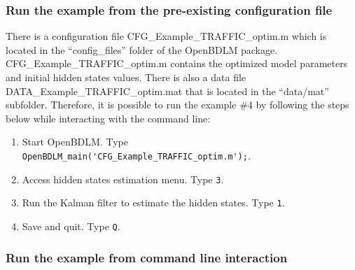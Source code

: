 \subsubsection{Run the example from the pre-existing configuration file}
\label{SS:LoadConfigFileTraffic}


There is a configuration file CFG\_Example\_TRAFFIC\_optim.m which is located in the ``config\_files'' folder of the OpenBDLM package.
CFG\_Example\_TRAFFIC\_optim.m contains the optimized model parameters and initial hidden states values.
There is also a data file DATA\_Example\_TRAFFIC\_optim.mat that is located in the ``data/mat'' subfolder.
Therefore, it is possible to run the example \#4 by following the steps below while interacting with the \MATLAB{} command line:
\begin{enumerate}
\item Start OpenBDLM. Type \colorbox{light-gray}{\lstinline[basicstyle = \mlttfamily \small, backgroundcolor = \color{light-gray}]!OpenBDLM_main('CFG_Example_TRAFFIC_optim.m');!}.
\item Access hidden states estimation menu. Type \colorbox{light-gray}{\lstinline[basicstyle = \mlttfamily \small, backgroundcolor = \color{light-gray}]!3!}.
\item Run the Kalman filter to estimate the hidden states. Type \colorbox{light-gray}{\lstinline[basicstyle = \mlttfamily \small, backgroundcolor = \color{light-gray}]!1!}.
\item Save and quit. Type \colorbox{light-gray}{\lstinline[basicstyle = \mlttfamily \small, backgroundcolor = \color{light-gray}]!Q!}.
\end{enumerate}


\subsubsection{Run the example from command line interaction}

